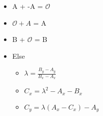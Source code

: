 \begin{itemize}
    \item[] A + -A = $\mathcal{O}$
    \item[] $\mathcal{O} + A $ = A
    \item[] B + $\mathcal{O}$ = B
    \item[] Else
    \begin{itemize}
        \item[] $\lambda = \frac{B_y - A_y} {B_x - A_x}$
        \item[] $C_x = \lambda^2 - A_x - B_x$
        \item[] $C_y = \lambda(A_x - C_x) - A_y$
    \end{itemize}
\end{itemize}

